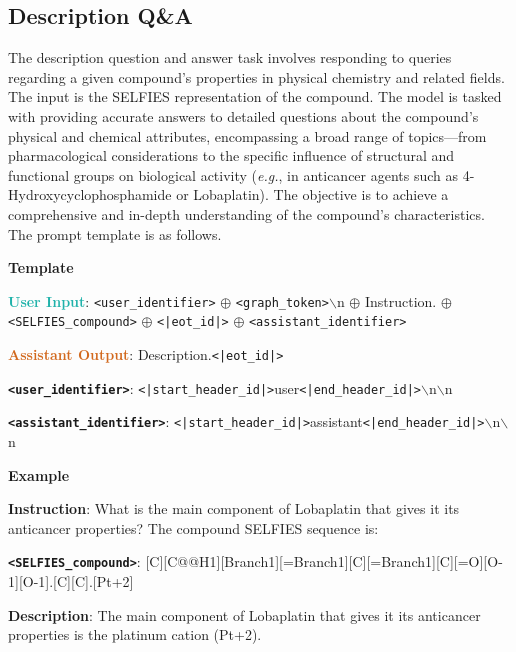 \subsection{Description Q\&A}
The description question and answer task involves responding to queries regarding a given compound’s properties in physical chemistry and related fields. The input is the SELFIES representation of the compound. The model is tasked with providing accurate answers to detailed questions about the compound’s physical and chemical attributes, encompassing a broad range of topics—from pharmacological considerations to the specific influence of structural and functional groups on biological activity (\emph{e.g.}, in anticancer agents such as 4-Hydroxycyclophosphamide or Lobaplatin). The objective is to achieve a comprehensive and in-depth understanding of the compound’s characteristics. The prompt template is as follows.

\begin{tcolorbox}[colback=white!98!black,colframe=white!30!black,boxsep=1.1pt,top=6.75pt]%
\scriptsize
\noindent\makebox[\textwidth]{\rule{\textwidth}{1pt}}
\textbf{Template}
\\[-0.575em]
\noindent\makebox[\textwidth]{\rule{\textwidth}{1pt}}

\textbf{\textcolor[HTML]{20B2AA}{User Input}}: {\tt <user\_identifier>} $\oplus$ {\tt <graph\_token>}$\backslash$n $\oplus$ Instruction. $\oplus$ {\tt <SELFIES\_compound>} $\oplus$ {\tt <|eot\_id|>} $\oplus$ {\tt <assistant\_identifier>}

\textbf{\textcolor[HTML]{D2691E}{Assistant Output}}: Description.{\tt <|eot\_id|>}

{\tt \textbf{<user\_identifier>}}: {\tt <|start\_header\_id|>}user{\tt <|end\_header\_id|>}$\backslash$n$\backslash$n

{\tt \textbf{<assistant\_identifier>}}: {\tt <|start\_header\_id|>}assistant{\tt <|end\_header\_id|>}$\backslash$n$\backslash$n

\noindent\makebox[\textwidth]{\rule{\textwidth}{1pt}}
\textbf{Example}
\\[-0.575em]
\noindent\makebox[\textwidth]{\rule{\textwidth}{1pt}}

\begin{tcolorbox}[colback=cyan!7!white,colframe=white!98!black,boxsep=1.1pt,top=6.75pt]
\textbf{Instruction}: What is the main component of Lobaplatin that gives it its anticancer properties? The compound SELFIES sequence is:

{\tt \textbf{<SELFIES\_compound>}}: [C][C@@H1][Branch1][=Branch1][C][=Branch1][C][=O][O-1][O-1].[C][C]\-[C@H1][Branch1][=Branch1][C@@H1][Ring1] [Ring2][C][N][C][N].[Pt+2]

\end{tcolorbox}

\begin{tcolorbox}[colback=orange!7!white,colframe=white!98!black,boxsep=1.1pt,top=6.75pt]
\textbf{Description}: The main component of Lobaplatin that gives it its anticancer properties is the platinum cation (Pt+2).
\end{tcolorbox}

\end{tcolorbox}


